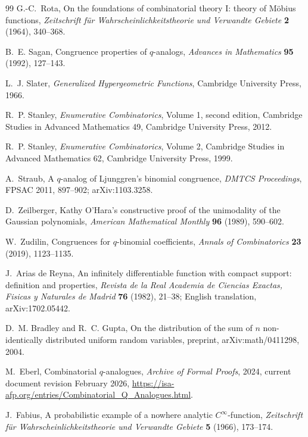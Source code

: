 \documentclass[11pt,oneside,openany]{book}
\theoremstyle{definition}
\theoremstyle{remark}
\begin{document}
\begin{thebibliography}{99}
G.-C.~Rota,
On the foundations of combinatorial theory I: theory of M\"obius functions,
\emph{Zeitschrift f\"ur Wahrscheinlichkeitstheorie und Verwandte Gebiete} \textbf{2} (1964), 340--368.

B.~E. Sagan,
Congruence properties of $q$-analogs,
\emph{Advances in Mathematics} \textbf{95} (1992), 127--143.

L.~J. Slater,
\emph{Generalized Hypergeometric Functions},
Cambridge University Press, 1966.

R.~P. Stanley,
\emph{Enumerative Combinatorics}, Volume 1, second edition,
Cambridge Studies in Advanced Mathematics 49, Cambridge University Press, 2012.

R.~P. Stanley,
\emph{Enumerative Combinatorics}, Volume 2,
Cambridge Studies in Advanced Mathematics 62, Cambridge University Press, 1999.

A.~Straub,
A $q$-analog of Ljunggren's binomial congruence,
\emph{DMTCS Proceedings}, FPSAC 2011, 897--902; arXiv:1103.3258.

D.~Zeilberger,
Kathy O'Hara's constructive proof of the unimodality of the Gaussian polynomials,
\emph{American Mathematical Monthly} \textbf{96} (1989), 590--602.

W.~Zudilin,
Congruences for $q$-binomial coefficients,
\emph{Annals of Combinatorics} \textbf{23} (2019), 1123--1135.

J.~Arias de Reyna,
An infinitely differentiable function with compact support: definition and properties,
\emph{Revista de la Real Academia de Ciencias Exactas, Fisicas y Naturales de Madrid} \textbf{76} (1982), 21--38;
English translation, arXiv:1702.05442.

D.~M. Bradley and R.~C. Gupta,
On the distribution of the sum of $n$ non-identically distributed uniform random variables,
preprint, arXiv:math/0411298, 2004.

M.~Eberl,
Combinatorial $q$-analogues,
\emph{Archive of Formal Proofs}, 2024, current document revision February 2026,
\url{https://isa-afp.org/entries/Combinatorial_Q_Analogues.html}.

J.~Fabius,
A probabilistic example of a nowhere analytic $C^\infty$-function,
\emph{Zeitschrift f\"ur Wahrscheinlichkeitstheorie und Verwandte Gebiete} \textbf{5} (1966), 173--174.


\end{thebibliography}
\end{document}
